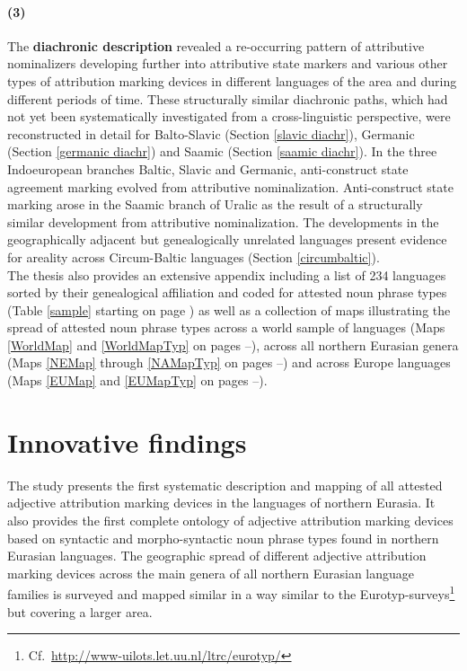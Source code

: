 \paragraph{(3)} The {\bf diachronic description} revealed a re-occurring pattern of attributive nominalizers developing further into attributive state markers and various other types of attribution marking devices in different languages of the area and during different periods of time. These structurally similar diachronic paths, which had not yet been systematically investigated from a cross-linguistic perspective, were reconstructed in detail for Balto-Sla\-vic (Section \ref{slavic diachr}), Germanic (Section \ref{germanic diachr}) and Saamic (Section \ref{saamic diachr}). In the three Indoeuropean branches Baltic, Slavic and Germanic, anti-construct state agreement marking evolved from attributive nominalization. Anti-construct state marking arose in the Saamic branch of Uralic as the result of a structurally similar development from attributive nominalization. The developments in the geographically adjacent but genealogically unrelated languages present evidence for areality across Circum-Baltic languages (Section \ref{circumbaltic}).\\

\noindent The thesis also provides an extensive appendix including a list of 234 languages sorted by their genealogical affiliation and coded for attested noun phrase types (Table \ref{sample} starting on page \pageref{sample}) as well as a collection of maps illustrating the spread of attested noun phrase types across a world sample of languages (Maps \ref{WorldMap} and \ref{WorldMapTyp} on pages \pageref{WorldMap}–\pageref{WorldMapTyp}), across all northern Eurasian genera (Maps \ref{NEMap} through \ref{NAMapTyp} on pages \pageref{NEMap}–\pageref{NAMapTyp}) and across Europe languages (Maps \ref{EUMap} and \ref{EUMapTyp} on pages \pageref{EUMap}–\pageref{EUMapTyp}).

\section{Innovative findings}

The study presents the first systematic description and mapping of all attested adjective attribution marking devices in the languages of northern Eurasia. It also provides the first complete ontology of adjective attribution marking devices based on syntactic and morpho-syntactic noun phrase types found in northern Eurasian languages. The geographic spread of different adjective attribution marking devices across the main genera of all northern Eurasian language families is surveyed and mapped similar in a way similar to the Eurotyp-surveys\footnote{Cf.~\url{http://www-uilots.let.uu.nl/ltrc/eurotyp/}} but covering a larger area. 

